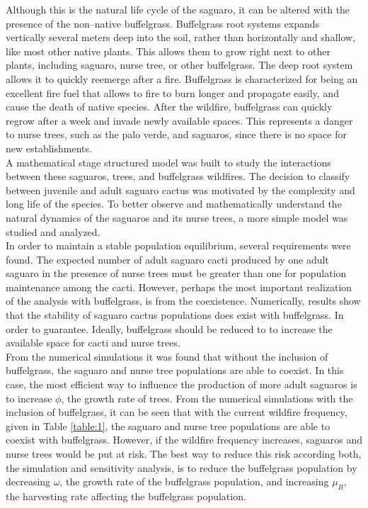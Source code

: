 \documentclass[a4paper]{article}
\begin{document}
Although this is the natural life cycle of the saguaro, it can be altered with the presence of the non--native buffelgrass. Buffelgrass root systems expands vertically several meters deep into the soil, rather than horizontally and shallow, like most other native plants. This allows them to grow right next to other plants,  including saguaro, nurse tree, or other buffelgrass. The deep root system allows it to quickly reemerge after a fire. Buffelgrass is characterized for being an excellent fire fuel that allows to fire to burn longer and propagate easily, and cause the death of native species. After the wildfire, buffelgrass can quickly regrow after a week and invade newly available spaces. This represents a danger to nurse trees, such as the palo verde, and saguaros, since there is no space for new establishments.\\

A mathematical stage structured model was built to study the interactions between these saguaros, trees, and buffelgrass wildfires. The decision to classify between juvenile and adult saguaro cactus was motivated by the complexity and long life of the species. To better observe and mathematically understand the natural dynamics of the saguaros and its nurse trees, a more simple model was studied and analyzed.\\

In order to maintain a stable population equilibrium, several requirements were found. The expected number of adult saguaro cacti produced by one adult saguaro in the presence of nurse trees must be greater than one for population maintenance among the cacti. However, perhaps the most important realization of the analysis with buffelgrass, is from the coexistence. Numerically, results show that the stability of saguaro cactus populations does exist with buffelgrass. In order to guarantee. Ideally, buffelgrass should be reduced to to increase the available space for cacti and nurse trees.\\

From the numerical simulations it was found that without the inclusion of buffelgrass, the saguaro and nurse tree populations are able to coexist. In this case, the most efficient way to influence the production of more adult saguaros is to increase $\phi$, the growth rate of trees. From the numerical simulations with the inclusion of buffelgrass, it can be seen that with the current wildfire frequency, given in Table \ref{table:1}, the saguaro and nurse tree populations are able to coexist with buffelgrass. However, if the wildfire frequency increases, saguaros and nurse trees would be put at risk. The best way to reduce this risk according both, the simulation and sensitivity analysis, is to reduce the buffelgrass population by decreasing $\omega$, the growth rate of the buffelgrass population, and increasing $\mu_B$, the harvesting rate affecting the buffelgrass population. \\
\end{document}
